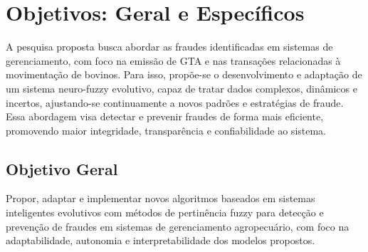 \chapter{Objetivos: Geral e Específicos}
\label{chap:objetivos}


A pesquisa proposta busca abordar as fraudes identificadas em sistemas de gerenciamento, com foco na emissão de GTA e nas transações relacionadas à movimentação de bovinos. Para isso, propõe-se o desenvolvimento e adaptação de um sistema neuro-fuzzy evolutivo, capaz de tratar dados complexos, dinâmicos e incertos, ajustando-se continuamente a novos padrões e estratégias de fraude. Essa abordagem visa detectar e prevenir fraudes de forma mais eficiente, promovendo maior integridade, transparência e confiabilidade ao sistema.

\section{Objetivo Geral}

Propor, adaptar e implementar novos algoritmos baseados em sistemas inteligentes evolutivos com métodos de pertinência fuzzy para detecção e prevenção de fraudes em sistemas de gerenciamento agropecuário, com foco na adaptabilidade, autonomia e interpretabilidade dos modelos propostos.


